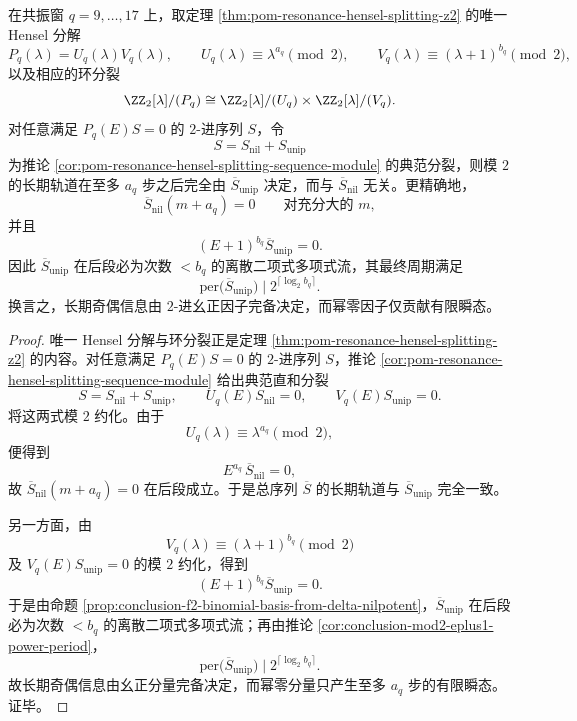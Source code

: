 \begin{theorem}\label{thm:conclusion-resonance-z2-unipotent-complete-parity}
在共振窗 \(q=9,\dots,17\) 上，取定理 \ref{thm:pom-resonance-hensel-splitting-z2} 的唯一 Hensel 分解
\[
P_q(\lambda)=U_q(\lambda)V_q(\lambda),
\qquad
U_q(\lambda)\equiv \lambda^{a_q}\pmod 2,
\qquad
V_q(\lambda)\equiv (\lambda+1)^{b_q}\pmod 2,
\]
以及相应的环分裂
\[
\ZZ_2[\lambda]/(P_q)
\cong
\ZZ_2[\lambda]/(U_q)\times \ZZ_2[\lambda]/(V_q).
\]
对任意满足 \(P_q(E)S=0\) 的 \(2\)-进序列 \(S\)，令
\[
S=S_{\mathrm{nil}}+S_{\mathrm{unip}}
\]
为推论 \ref{cor:pom-resonance-hensel-splitting-sequence-module} 的典范分裂，则模 \(2\) 的长期轨道在至多 \(a_q\) 步之后完全由 \(\overline{S}_{\mathrm{unip}}\) 决定，而与 \(\overline{S}_{\mathrm{nil}}\) 无关。更精确地，
\[
\overline{S}_{\mathrm{nil}}(m+a_q)=0
\qquad\text{对充分大的 }m,
\]
并且
\[
(E+1)^{b_q}\overline{S}_{\mathrm{unip}}=0.
\]
因此 \(\overline{S}_{\mathrm{unip}}\) 在后段必为次数 \(<b_q\) 的离散二项式多项式流，其最终周期满足
\[
\mathrm{per}\bigl(\overline{S}_{\mathrm{unip}}\bigr)\mid 2^{\lceil\log_2 b_q\rceil}.
\]
换言之，长期奇偶信息由 \(2\)-进幺正因子完备决定，而幂零因子仅贡献有限瞬态。
\end{theorem}
\begin{proof}
唯一 Hensel 分解与环分裂正是定理 \ref{thm:pom-resonance-hensel-splitting-z2} 的内容。对任意满足 \(P_q(E)S=0\) 的 \(2\)-进序列 \(S\)，推论 \ref{cor:pom-resonance-hensel-splitting-sequence-module} 给出典范直和分裂
\[
S=S_{\mathrm{nil}}+S_{\mathrm{unip}},
\qquad
U_q(E)S_{\mathrm{nil}}=0,
\qquad
V_q(E)S_{\mathrm{unip}}=0.
\]
将这两式模 \(2\) 约化。由于
\[
U_q(\lambda)\equiv \lambda^{a_q}\pmod 2,
\]
便得到
\[
E^{a_q}\,\overline{S}_{\mathrm{nil}}=0,
\]
故 \(\overline{S}_{\mathrm{nil}}(m+a_q)=0\) 在后段成立。于是总序列 \(\overline S\) 的长期轨道与 \(\overline{S}_{\mathrm{unip}}\) 完全一致。

另一方面，由
\[
V_q(\lambda)\equiv (\lambda+1)^{b_q}\pmod 2
\]
及 \(V_q(E)S_{\mathrm{unip}}=0\) 的模 \(2\) 约化，得到
\[
(E+1)^{b_q}\overline{S}_{\mathrm{unip}}=0.
\]
于是由命题 \ref{prop:conclusion-f2-binomial-basis-from-delta-nilpotent}，\(\overline{S}_{\mathrm{unip}}\) 在后段必为次数 \(<b_q\) 的离散二项式多项式流；再由推论 \ref{cor:conclusion-mod2-eplus1-power-period}，
\[
\mathrm{per}\bigl(\overline{S}_{\mathrm{unip}}\bigr)\mid 2^{\lceil\log_2 b_q\rceil}.
\]
故长期奇偶信息由幺正分量完备决定，而幂零分量只产生至多 \(a_q\) 步的有限瞬态。证毕。
\end{proof}


